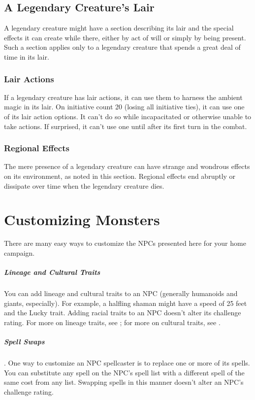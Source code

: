 \subsection{A Legendary Creature's Lair}

A legendary creature might have a section describing its lair and the special effects it can create while there, either by act of will or simply by being present. Such a section applies only to a legendary creature that spends a great deal of time in its lair.

\subsubsection{Lair Actions}

If a legendary creature has lair actions, it can use them to harness the ambient magic in its lair. On initiative count 20 (losing all initiative ties), it can use one of its lair action options. It can't do so while incapacitated or otherwise unable to take actions. If surprised, it can't use one until after its first turn in the combat.

\subsubsection{Regional Effects}

The mere presence of a legendary creature can have strange and wondrous effects on its environment, as noted in this section. Regional effects end abruptly or dissipate over time when the legendary creature dies.

\section{Customizing Monsters}

There are many easy ways to customize the NPCs presented here for your home campaign.

\subparagraph*{Lineage and Cultural Traits} You can add lineage and cultural traits to an NPC (generally humanoids and giants, especially). For example, a halfling shaman might have a speed of 25 feet and the Lucky trait. Adding racial traits to an NPC doesn't alter its challenge rating. For more on lineage traits, see ; for more on cultural traits, see .

\subparagraph*{Spell Swaps}. One way to customize an NPC spellcaster is to replace one or more of its spells. You can substitute any spell on the NPC's spell list with a different spell of the same cost from any list. Swapping spells in this manner doesn't alter an NPC's challenge rating.

